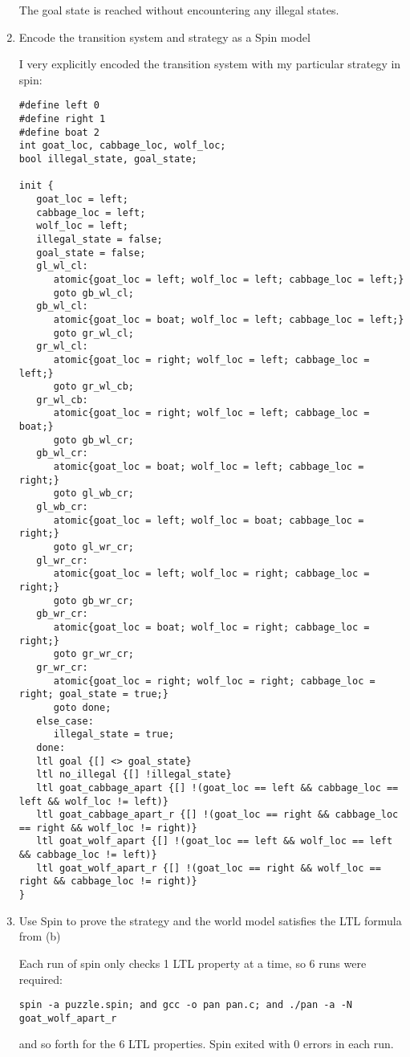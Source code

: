 \begin{enumerate}[label=(\alph*)]
    The goal state is reached without encountering any illegal states.

  \item {\color{blue}Encode the transition system and strategy as a Spin model}

    I very explicitly encoded the transition system with my particular strategy in spin:
    \begin{verbatim}
#define left 0
#define right 1
#define boat 2
int goat_loc, cabbage_loc, wolf_loc;
bool illegal_state, goal_state;

init {
   goat_loc = left;
   cabbage_loc = left;
   wolf_loc = left;
   illegal_state = false;
   goal_state = false;
   gl_wl_cl:
      atomic{goat_loc = left; wolf_loc = left; cabbage_loc = left;}
      goto gb_wl_cl;
   gb_wl_cl:
      atomic{goat_loc = boat; wolf_loc = left; cabbage_loc = left;}
      goto gr_wl_cl;
   gr_wl_cl:
      atomic{goat_loc = right; wolf_loc = left; cabbage_loc = left;}
      goto gr_wl_cb;
   gr_wl_cb:
      atomic{goat_loc = right; wolf_loc = left; cabbage_loc = boat;}
      goto gb_wl_cr;
   gb_wl_cr:
      atomic{goat_loc = boat; wolf_loc = left; cabbage_loc = right;}
      goto gl_wb_cr;
   gl_wb_cr:
      atomic{goat_loc = left; wolf_loc = boat; cabbage_loc = right;}
      goto gl_wr_cr;
   gl_wr_cr:
      atomic{goat_loc = left; wolf_loc = right; cabbage_loc = right;}
      goto gb_wr_cr;
   gb_wr_cr:
      atomic{goat_loc = boat; wolf_loc = right; cabbage_loc = right;}
      goto gr_wr_cr;
   gr_wr_cr:
      atomic{goat_loc = right; wolf_loc = right; cabbage_loc = right; goal_state = true;}
      goto done;
   else_case:
      illegal_state = true;
   done:
   ltl goal {[] <> goal_state}
   ltl no_illegal {[] !illegal_state}
   ltl goat_cabbage_apart {[] !(goat_loc == left && cabbage_loc == left && wolf_loc != left)}
   ltl goat_cabbage_apart_r {[] !(goat_loc == right && cabbage_loc == right && wolf_loc != right)}
   ltl goat_wolf_apart {[] !(goat_loc == left && wolf_loc == left && cabbage_loc != left)}
   ltl goat_wolf_apart_r {[] !(goat_loc == right && wolf_loc == right && cabbage_loc != right)}
}
    \end{verbatim}

  \item {\color{blue}Use Spin to prove the strategy and the world model satisfies the LTL formula from (b)}

    Each run of spin only checks 1 LTL property at a time, so 6 runs were required:

    \begin{verbatim}
spin -a puzzle.spin; and gcc -o pan pan.c; and ./pan -a -N goat_wolf_apart_r
    \end{verbatim}

    and so forth for the 6 LTL properties. Spin exited with 0 errors in each run.
\end{enumerate}

